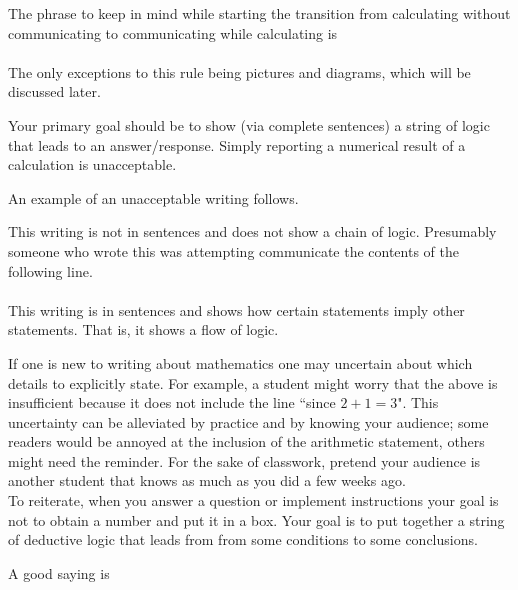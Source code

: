 \documentclass[12pt]{article}
\def\thup{\rightthumbsup}
\def\thdn{\rightthumbsdown}
\def\noi{\noindent}
\begin{document}
The phrase to keep in mind while starting the transition from calculating without communicating to communicating while calculating is\\

 \\

\noi The only exceptions to this rule being pictures and diagrams, which will be discussed later.

Your primary goal should be to show (via complete sentences) a string of logic that leads to an answer/response. 
Simply reporting a numerical result of a calculation is unacceptable. 

An example of an unacceptable writing follows.
\begin{quote}
 \thdn
\end{quote}
This writing is not in sentences and does not show a chain of logic. 
Presumably someone who wrote this was attempting communicate the contents of the following line.\\

\noi {}\thup\\

\noi This writing is in sentences and shows how certain statements imply other statements. That is, it shows a flow of logic. 

If one is new to writing about mathematics one may uncertain about which details to explicitly state. For example, a student might worry that the above is insufficient because it does not include the line ``since $2+1=3$". This uncertainty can be alleviated by practice and by knowing your audience; some readers would be annoyed at the inclusion of the arithmetic statement, others might need the reminder. For the sake of classwork, pretend your audience is another student that knows as much as you did a few weeks ago. \\

To reiterate, 
when you answer a question or implement instructions 
 your goal is not to obtain a number and put it in a box. 
 Your goal is to put together a string of deductive logic that leads from from some conditions to some conclusions. 
 
A good saying is 

\begin{quote}
 \thup
\end{quote}
\end{document}
